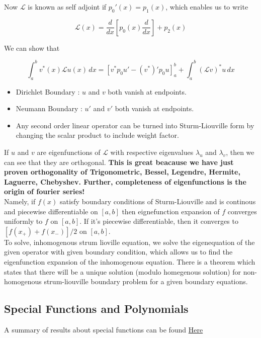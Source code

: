 \documentclass{report}
\begin{document}
\noindent Now $\mathcal{L}$ is known as self adjoint if $p_0'(x) = p_1(x)$, which enables us to write 

$$\mathcal{L}(x) = \frac{d}{dx}\left[p_0(x)\frac{d}{dx}\right]+p_2(x)$$

\noindent We can show that

$$\int_{a}^{b}v^*(x)\mathcal{L}u(x)\,dx = \left[v^* p_0 u' - (v^*)'p_0 u\right]_{a}^{b} + \int_{a}^{b}(\mathcal{L}v)^* u \,dx$$

\begin{itemize}
  \item Dirichlet Boundary : $u$ and $v$ both vanish at endpoints.
  \item Neumann Boundary : $u'$ and $v'$ both vanish at endpoints.
  \item Any second order linear operator can be turned into Sturm-Liouville form by changing the scalar product to include weight factor.
\end{itemize}

\noindent If $u$ and $v$ are eigenfunctions of $\mathcal{L}$ with respective eigenvalues $\lambda_u$ and $\lambda_v$, then we can see that they are orthogonal. \textbf{This is great beacause we have just proven orthogonality of Trigonometric, Bessel, Legendre, Hermite, Laguerre, Chebyshev. Further, completeness of eigenfunctions is the origin of fourier series!}\\

\noindent Namely, if $f(x)$ satisfy boundary conditions of Sturm-Liouville and is continous and piecewise differentiable on $[a,b]$ then eignefunction expansion of $f$ converges uniformly to $f$ on $[a,b]$. If it's piecewise differentiable, then it converges to $[f(x_+) + f(x_-)]/2$ on $[a,b]$.\\

\noindent To solve, inhomogenous strum lioville equation, we solve the eigenequation of the given operator with given boundary condition, which allows us to find the eigenfunction expansion of the inhomogenous equation. There is a theorem which states that there will be a unique solution (modulo homegenous solution) for non-homogenous strum-liouville boundary problem for a given boundary equations.

\subsection{Special Functions and Polynomials}

A summary of results about special functions can be found \href{https://webspace.science.uu.nl/~hooft101/lectures/specialfct.pdf}{Here}
\end{document}
